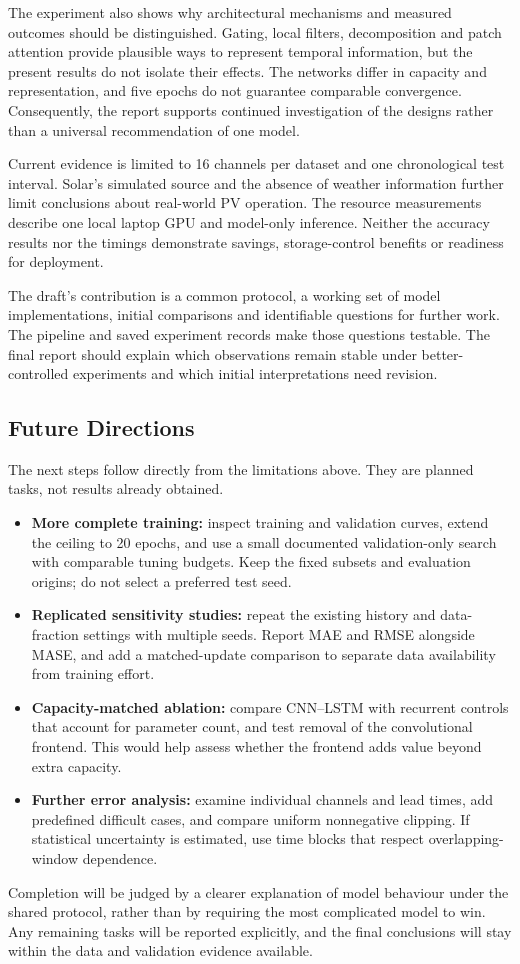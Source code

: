\documentclass[11pt,a4paper]{article}
\begin{document}
The experiment also shows why architectural mechanisms and measured outcomes should be distinguished. Gating, local filters, decomposition and patch attention provide plausible ways to represent temporal information, but the present results do not isolate their effects. The networks differ in capacity and representation, and five epochs do not guarantee comparable convergence. Consequently, the report supports continued investigation of the designs rather than a universal recommendation of one model.

Current evidence is limited to 16 channels per dataset and one chronological test interval. Solar's simulated source and the absence of weather information further limit conclusions about real-world PV operation. The resource measurements describe one local laptop GPU and model-only inference. Neither the accuracy results nor the timings demonstrate savings, storage-control benefits or readiness for deployment.

The draft's contribution is a common protocol, a working set of model implementations, initial comparisons and identifiable questions for further work. The pipeline and saved experiment records make those questions testable. The final report should explain which observations remain stable under better-controlled experiments and which initial interpretations need revision.

\subsection{Future Directions}
The next steps follow directly from the limitations above. They are planned tasks, not results already obtained.
\begin{itemize}
\item \textbf{More complete training:} inspect training and validation curves, extend the ceiling to 20 epochs, and use a small documented validation-only search with comparable tuning budgets. Keep the fixed subsets and evaluation origins; do not select a preferred test seed.
\item \textbf{Replicated sensitivity studies:} repeat the existing history and data-fraction settings with multiple seeds. Report MAE and RMSE alongside MASE, and add a matched-update comparison to separate data availability from training effort.
\item \textbf{Capacity-matched ablation:} compare CNN--LSTM with recurrent controls that account for parameter count, and test removal of the convolutional frontend. This would help assess whether the frontend adds value beyond extra capacity.
\item \textbf{Further error analysis:} examine individual channels and lead times, add predefined difficult cases, and compare uniform nonnegative clipping. If statistical uncertainty is estimated, use time blocks that respect overlapping-window dependence.
\end{itemize}
Completion will be judged by a clearer explanation of model behaviour under the shared protocol, rather than by requiring the most complicated model to win. Any remaining tasks will be reported explicitly, and the final conclusions will stay within the data and validation evidence available.

\label{report:body-end}
\clearpage{}

\end{document}
